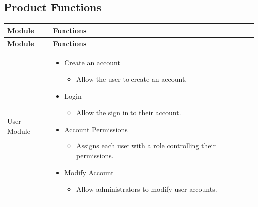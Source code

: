 \documentclass[]{article}
\begin{document}
\subsection{Product Functions}
\label{sub:product_functions}
\begin{longtable}{|p{3cm}|p{12cm}|}
\hline
\textbf{Module} & \textbf{Functions} \\
\hline
\endfirsthead

\hline
\textbf{Module} & \textbf{Functions} \\
\hline
\endhead

User Module &
\begin{itemize}
    \item Create an account
        \begin{itemize}
            \item Allow the user to create an account.
        \end{itemize}
    \item Login
        \begin{itemize}
            \item Allow the sign in to their account.
        \end{itemize}
    \item Account Permissions
        \begin{itemize}
            \item Assigns each user with a role controlling their permissions.
        \end{itemize}
    \item Modify Account
        \begin{itemize}
            \item Allow administrators to modify user accounts.
        \end{itemize}
\end{itemize}
\\[5pt]
\hline


\end{longtable}
\end{document}
